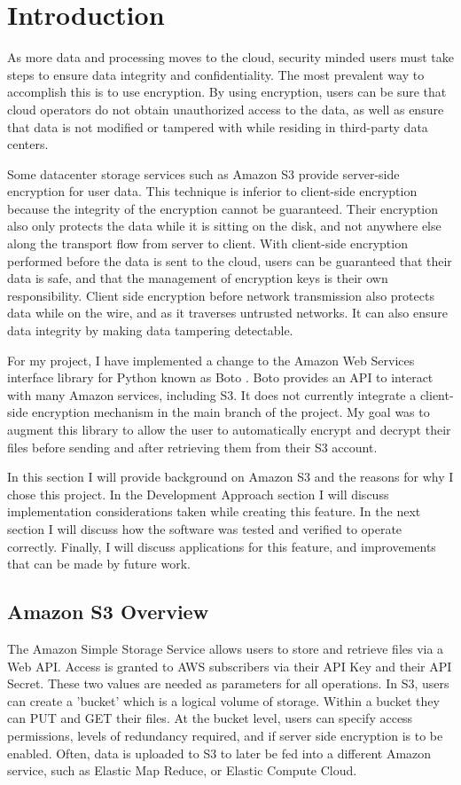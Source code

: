 \section{Introduction}
As more data and processing moves to the cloud, security minded users must take steps to ensure data integrity and confidentiality.
The most prevalent way to accomplish this is to use encryption. 
By using encryption, users can be sure that cloud operators do not
obtain unauthorized access to the data, as well as ensure that data is not modified or tampered with while residing in third-party data centers.

Some datacenter storage services such as Amazon S3 \cite{amazons3} provide server-side encryption for user data. This technique is inferior to client-side encryption because the integrity of the encryption cannot be guaranteed.
Their encryption also only protects the data while it is sitting on the disk, and not anywhere else along the transport flow from server to client.
With client-side encryption performed before the data is sent to the cloud, users can be guaranteed that their data is safe, and that the management of encryption keys is their own responsibility. 
Client side encryption before network transmission also protects data while on the wire, and as it traverses untrusted networks.
It can also ensure data integrity by making data tampering detectable.

For my project, I have implemented a change to the Amazon Web Services interface library for Python known as Boto \cite{boto}. 
Boto provides an API to interact with many Amazon services, including S3. 
It does not currently integrate a client-side encryption mechanism in the main branch of the project. 
My goal was to augment this library to allow the user to automatically encrypt and decrypt their files before sending and 
after retrieving them from their S3 account.

In this section I will provide background on Amazon S3 and the reasons for why I chose this project. In the Development Approach section I 
will discuss implementation considerations taken while creating this feature. In the next section I will discuss how the 
software was tested and verified to operate correctly. Finally, I will discuss applications for this feature, and improvements that
can be made by future work.

\subsection{Amazon S3 Overview}
The Amazon Simple Storage Service allows users to store and retrieve files via a Web API. Access is granted to AWS 
subscribers via their API Key and their API Secret. These two values are needed as parameters for all operations. In S3, 
users can create a 'bucket' which is a logical volume of storage. Within a bucket they can PUT and GET their files. 
At the bucket level, users can specify access permissions, levels of redundancy required, and if server side encryption is to 
be enabled. Often, data is uploaded to S3 to later be fed into a different Amazon service, such as Elastic Map Reduce, or 
Elastic Compute Cloud.

